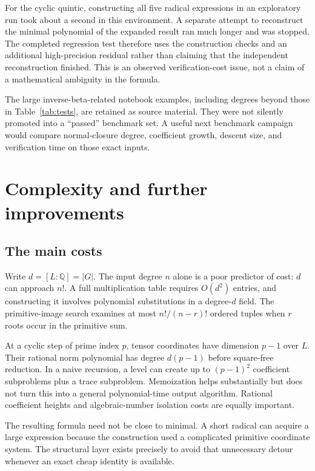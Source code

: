 \documentclass[11pt]{article}
\theoremstyle{definition}\newtheorem{definition}[theorem]{Definition}
\theoremstyle{remark}\newtheorem{remark}[theorem]{Remark}
\newcommand{\Q}{\mathbb Q}\newcommand{\C}{\mathbb C}\newcommand{\Z}{\mathbb Z}
\begin{document}
For the cyclic quintic, constructing all five radical expressions in an
exploratory run took about a second in this environment. A separate attempt
to reconstruct the minimal polynomial of the expanded result ran much longer
and was stopped. The completed regression test therefore uses the construction
checks and an additional high-precision residual rather than claiming that the
independent reconstruction finished. This is an observed verification-cost
issue, not a claim of a mathematical ambiguity in the formula.

The large inverse-beta-related notebook examples, including degrees beyond
those in Table~\ref{tab:tests}, are retained as source material. They were not
silently promoted into a ``passed'' benchmark set. A useful next benchmark
campaign would compare normal-closure degree, coefficient growth, descent size,
and verification time on those exact inputs.

\section{Complexity and further improvements}\label{sec:improvements}

\subsection{The main costs}

Write $d=[L:\Q]=|G|$. The input degree $n$ alone is a poor predictor of cost:
$d$ can approach $n!$. A full multiplication table requires $O(d^2)$ entries,
and constructing it involves polynomial substitutions in a degree-$d$ field.
The primitive-image search examines at most $n!/(n-r)!$ ordered tuples when
$r$ roots occur in the primitive sum.

At a cyclic step of prime index $p$, tensor coordinates have dimension $p-1$
over $L$. Their rational norm polynomial has degree $d(p-1)$ before square-free
reduction. In a naive recursion, a level can create up to $(p-1)^2$ coefficient
subproblems plus a trace subproblem. Memoization helps substantially but does
not turn this into a general polynomial-time output algorithm. Rational
coefficient heights and algebraic-number isolation costs are equally important.

The resulting formula need not be close to minimal. A short radical can acquire
a large expression because the construction used a complicated primitive
coordinate system. The structural layer exists precisely to avoid that
unnecessary detour whenever an exact cheap identity is available.
\end{document}
